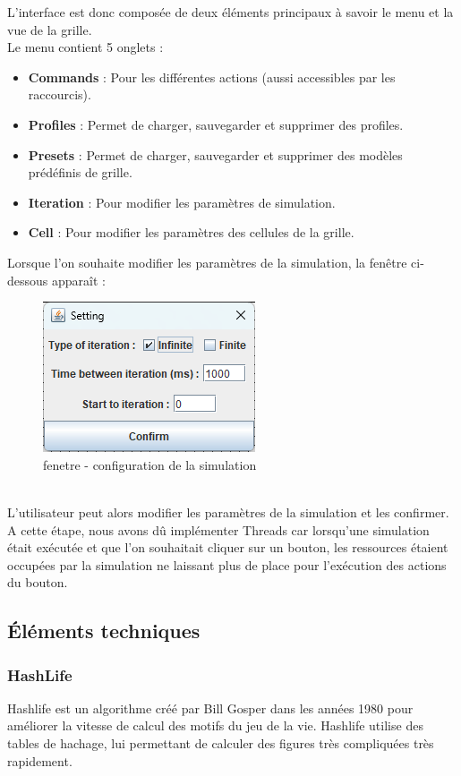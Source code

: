 \documentclass[12pt]{article}
\begin{document}
			L'interface est donc composée de deux éléments principaux à savoir le menu et la vue de la grille.\\ 
			Le menu contient 5 onglets : \\
			\begin{itemize}[label= ]
				\item \textbf{Commands} : Pour les différentes actions (aussi accessibles par les raccourcis).
				\item \textbf{Profiles} : Permet de charger, sauvegarder et supprimer des profiles.
				\item \textbf{Presets} : Permet de charger, sauvegarder et supprimer des modèles prédéfinis de grille.
				\item  \textbf{Iteration} : Pour modifier les paramètres de simulation.
				\item \textbf{Cell} : Pour modifier les paramètres des cellules de la grille.
			\end{itemize}
			
			Lorsque l’on souhaite modifier les paramètres de la simulation, la fenêtre ci-dessous apparaît :
			\begin{figure}[!ht]
				\centering
				\includegraphics[width=.5\textwidth]{images/jdialog.png}
				\caption{fenetre - configuration de la simulation}
			\end{figure}\\
		
			L’utilisateur peut alors modifier les paramètres de la simulation et les confirmer. A cette étape, nous avons dû implémenter Threads car lorsqu’une simulation était exécutée et que l’on souhaitait cliquer sur un bouton, les ressources étaient occupées par la simulation ne laissant plus de place pour l’exécution des actions du bouton.
			
			
			\subsection{Éléments techniques}
			\subsubsection{HashLife}
			\label{hashlife}
			Hashlife est un algorithme créé par Bill Gosper dans les années 1980 pour améliorer la vitesse de calcul des motifs du jeu de la vie. Hashlife utilise des tables de hachage, lui permettant de calculer des figures très compliquées très rapidement.
			
\end{document}
